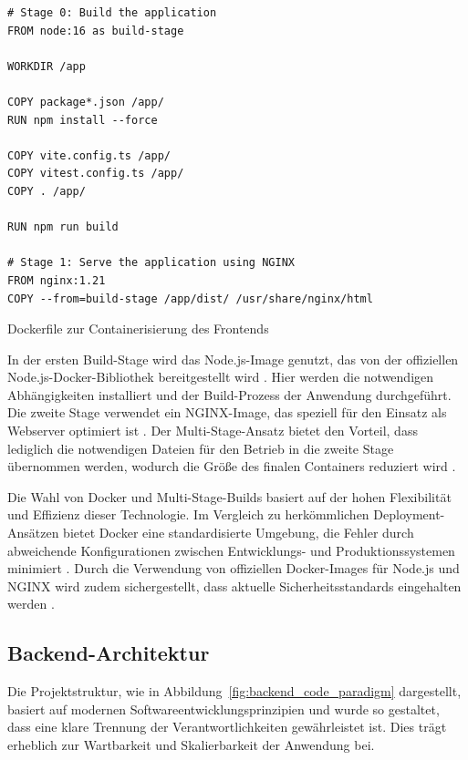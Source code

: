 \begin{listing}[H]
\begin{verbatim}
# Stage 0: Build the application
FROM node:16 as build-stage

WORKDIR /app

COPY package*.json /app/
RUN npm install --force

COPY vite.config.ts /app/
COPY vitest.config.ts /app/
COPY . /app/

RUN npm run build

# Stage 1: Serve the application using NGINX
FROM nginx:1.21
COPY --from=build-stage /app/dist/ /usr/share/nginx/html
\end{verbatim}
\caption{Dockerfile zur Containerisierung des Frontends}
\label{lst:dockerfile_frontend}
\end{listing}

In der ersten Build-Stage wird das Node.js-Image genutzt, das von der offiziellen Node.js-Docker-Bibliothek bereitgestellt wird \cite{node2021docker}. Hier werden die notwendigen Abhängigkeiten installiert und der Build-Prozess der Anwendung durchgeführt. Die zweite Stage verwendet ein NGINX-Image, das speziell für den Einsatz als Webserver optimiert ist \cite{nginx2021docker}. Der Multi-Stage-Ansatz bietet den Vorteil, dass lediglich die notwendigen Dateien für den Betrieb in die zweite Stage übernommen werden, wodurch die Größe des finalen Containers reduziert wird \cite{docker2020mastery}.

Die Wahl von Docker und Multi-Stage-Builds basiert auf der hohen Flexibilität und Effizienz dieser Technologie. Im Vergleich zu herkömmlichen Deployment-Ansätzen bietet Docker eine standardisierte Umgebung, die Fehler durch abweichende Konfigurationen zwischen Entwicklungs- und Produktionssystemen minimiert \cite{docker2019production}. Durch die Verwendung von offiziellen Docker-Images für Node.js und NGINX wird zudem sichergestellt, dass aktuelle Sicherheitsstandards eingehalten werden \cite{node2021docker, nginx2021docker}.



\subsection{Backend-Architektur}
Die Projektstruktur, wie in Abbildung~\ref{fig:backend_code_paradigm} dargestellt, basiert auf modernen Softwareentwicklungsprinzipien und wurde so gestaltet, dass eine klare Trennung der Verantwortlichkeiten gewährleistet ist. Dies trägt erheblich zur Wartbarkeit und Skalierbarkeit der Anwendung bei.

